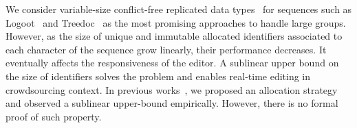 We consider variable-size conflict-free replicated data
types~\cite{shapiro2011comprehensive} for sequences such as
Logoot~\cite{weiss2010logootundo} and Treedoc~\cite{preguica2009commutative} as
the most promising approaches to handle large groups. However, as the size of
unique and immutable allocated identifiers associated to each character of the
sequence grow linearly, their performance decreases. It eventually affects the
responsiveness of the editor. A sublinear upper bound on the size of identifiers
solves the problem and enables real-time editing in crowdsourcing context.  In
previous works~\cite{nedelec2013concurrency, nedelec2013lseq}, we proposed an
allocation strategy and observed a sublinear upper-bound empirically. However,
there is no formal proof of such property.




